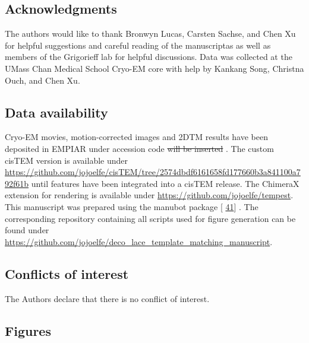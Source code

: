 \documentclass[
]{article}
\providecommand{\DIFaddtex}[1]{{\protect\color{blue}\uwave{#1}}} %
\providecommand{\DIFdeltex}[1]{{\protect\color{red}\sout{#1}}}                      %
\providecommand{\DIFaddbegin}{} %
\providecommand{\DIFaddend}{} %
\providecommand{\DIFdelbegin}{} %
\providecommand{\DIFdelend}{} %
\providecommand{\DIFadd}[1]{\texorpdfstring{\DIFaddtex{#1}}{#1}} %
\providecommand{\DIFdel}[1]{\texorpdfstring{\DIFdeltex{#1}}{}} %
\newcommand{\DIFscaledelfig}{0.5}
\newlength{\DIFdelgraphicswidth} %
\newlength{\DIFdelgraphicsheight} %
\newcommand{\DIFaddincludegraphics}[2][]{{\color{blue}\fbox{\DIFOincludegraphics[#1]{#2}}}} %
\newcommand{\DIFdelincludegraphics}[2][]{%
\sbox{\DIFdelgraphicsbox}{\DIFOincludegraphics[#1]{#2}}%
\settoboxwidth{\DIFdelgraphicswidth}{\DIFdelgraphicsbox} %
\settoboxtotalheight{\DIFdelgraphicsheight}{\DIFdelgraphicsbox} %
\scalebox{\DIFscaledelfig}{%
\parbox[b]{\DIFdelgraphicswidth}{\usebox{\DIFdelgraphicsbox}\\[-\baselineskip] \rule{\DIFdelgraphicswidth}{0em}}\llap{\resizebox{\DIFdelgraphicswidth}{\DIFdelgraphicsheight}{%
\setlength{\unitlength}{\DIFdelgraphicswidth}%
\begin{picture}(1,1)%
\thicklines\linethickness{2pt} %
{\color[rgb]{1,0,0}\put(0,0){\framebox(1,1){}}}%
{\color[rgb]{1,0,0}\put(0,0){\line( 1,1){1}}}%
{\color[rgb]{1,0,0}\put(0,1){\line(1,-1){1}}}%
\end{picture}%
}\hspace*{3pt}}} %
} %
\DeclareRobustCommand{\DIFaddbegin}{\DIFOaddbegin \let\includegraphics\DIFaddincludegraphics} %
\DeclareRobustCommand{\DIFaddend}{\DIFOaddend \let\includegraphics\DIFOincludegraphics} %
\DeclareRobustCommand{\DIFdelbegin}{\DIFOdelbegin \let\includegraphics\DIFdelincludegraphics} %
\DeclareRobustCommand{\DIFdelend}{\DIFOaddend \let\includegraphics\DIFOincludegraphics} %
\begin{document}
\hypertarget{acknowledgments}{%
\subsection{Acknowledgments}\label{acknowledgments}}

The authors would like to thank Bronwyn Lucas, Carsten Sachse, and Chen
Xu for helpful suggestions and careful reading of the manuscriptas as
well as members of the Grigorieff lab for helpful discussions. Data was
collected at the UMass Chan Medical School Cryo-EM core with help by
Kankang Song, Christna Ouch, and Chen Xu.

\hypertarget{data-availability}{%
\subsection{Data availability}\label{data-availability}}

Cryo-EM movies, motion-corrected images and 2DTM results have been
deposited in EMPIAR under accession code \DIFdelbegin %
\DIFdel{will be inserted}%
\DIFdelend \DIFaddbegin \DIFadd{EMPIAR-11063}\DIFaddend . The custom cisTEM
version is available under
\url{https://github.com/jojoelfe/cisTEM/tree/2574dbdf6161658fd177660b3a841100a792f61b}
until features have been integrated into a cisTEM release. The ChimeraX
extension for rendering is available under
\url{https://github.com/jojoelfe/tempest}. This manuscript was prepared
using the manubot package {[}\protect\DIFdelbegin %
\DIFdelend \DIFaddbegin \hyperlink{ref-YuJbg3zO}{41}{]} \DIFaddend . The
corresponding repository containing all scripts used for figure
generation can be found under
\url{https://github.com/jojoelfe/deco_lace_template_matching_manuscript}.

\hypertarget{conflicts-of-interest}{%
\subsection{Conflicts of interest}\label{conflicts-of-interest}}

The Authors declare that there is no conflict of interest.

\hypertarget{figures}{%
\subsection{Figures}\label{figures}}
\end{document}
